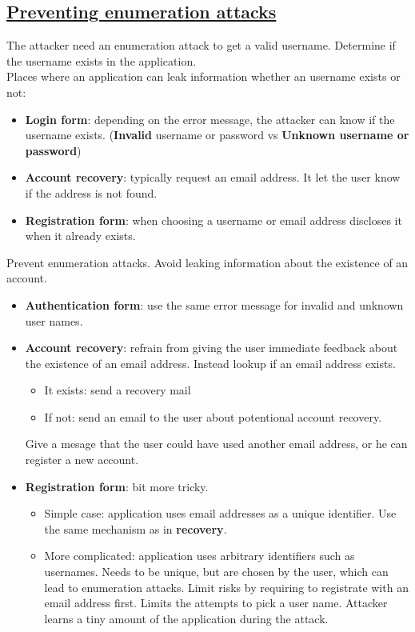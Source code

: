 \documentclass[titlepage]{article}
\begin{document}
    \subsection{\href{https://youtu.be/AjmA3xLL8Q4}{Preventing enumeration attacks}}
    The attacker need an enumeration attack to get a valid username. Determine if the username exists in the application.\\
    Places where an application can leak information whether an username exists or not:
    \begin{itemize}
        \item \textbf{Login form}: depending on the error message, the attacker can know if the username exists. (\textbf{Invalid} username or password vs \textbf{Unknown username or password})
        \item \textbf{Account recovery}: typically request an email address. It let the user know if the address is not found.
        \item \textbf{Registration form}: when choosing a username or email address discloses it when it already exists.
    \end{itemize}
    Prevent enumeration attacks. Avoid leaking information about the existence of an account.
    \begin{itemize}
        \item \textbf{Authentication form}: use the same error message for invalid and unknown user names.
        \item \textbf{Account recovery}: refrain from giving the user immediate feedback about the existence of an email address. Instead lookup if an email address exists.
        \begin{itemize}
            \item It exists: send a recovery mail
            \item If not: send an email to the user about potentional account recovery.
        \end{itemize}
        Give a mesage that the user could have used another email address, or he can register a new account.
        \item \textbf{Registration form}: bit more tricky.
        \begin{itemize}
            \item Simple case: application uses email addresses as a unique identifier. Use the same mechanism as in \textbf{recovery}.
            \item More complicated: application uses arbitrary identifiers such as usernames. Needs to be unique, but are chosen by the user, which can lead to enumeration attacks. Limit risks by requiring to registrate with an email address first. Limits the attempts to pick a user name. Attacker learns a tiny amount of the application during the attack.
        \end{itemize}
    \end{itemize}
\end{document}
